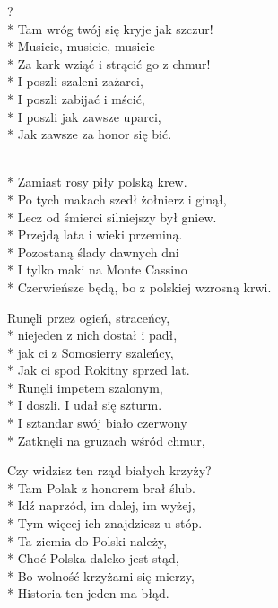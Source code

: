 \begin{lyrics}[longestline={Czerwieńsze będą, bo z polskiej wzrosną krwi.}]

?\\*
Tam wróg twój się kryje jak szczur!\\*
Musicie, musicie, musicie\\*
Za kark wziąć i strącić go z chmur!\\*
I poszli szaleni zażarci,\\*
I poszli zabijać i mścić,\\*
I poszli jak zawsze uparci,\\*
Jak zawsze za honor się bić.

\begin{chorus}
\\*
Zamiast rosy piły polską krew.\\*
Po tych makach szedł żołnierz i ginął,\\*
Lecz od śmierci silniejszy był gniew.\\*
Przejdą lata i wieki przeminą.\\*
Pozostaną ślady dawnych dni\\*
I tylko maki na Monte Cassino\\*
Czerwieńsze będą, bo z polskiej wzrosną krwi.
\end{chorus}

Runęli przez ogień, straceńcy,\\*
niejeden z nich dostał i padł,\\*
jak ci z Somosierry szaleńcy,\\*
Jak ci spod Rokitny sprzed lat.\\*
Runęli impetem szalonym,\\*
I doszli. I udał się szturm.\\*
I sztandar swój biało czerwony\\*
Zatknęli na gruzach wśród chmur,

\chorusref

Czy widzisz ten rząd białych krzyży?\\*
Tam Polak z honorem brał ślub.\\*
Idź naprzód, im dalej, im wyżej,\\*
Tym więcej ich znajdziesz u stóp.\\*
Ta ziemia do Polski należy,\\*
Choć Polska daleko jest stąd,\\*
Bo wolność krzyżami się mierzy,\\*
Historia ten jeden ma błąd.

\chorusref
\end{lyrics}



